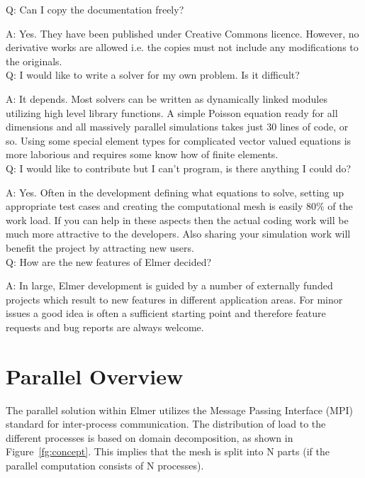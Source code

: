     Q: Can I copy the documentation freely?

    A: Yes. They have been published under Creative Commons licence. However, no derivative works are allowed i.e. the copies must not include any modifications to the originals.\\

    Q: I would like to write a solver for my own problem. Is it difficult?

    A: It depends. Most solvers can be written as dynamically linked modules utilizing high level library functions. A simple Poisson equation ready for all dimensions and all massively parallel simulations takes just 30 lines of code, or so. Using some special element types for complicated vector valued equations is more laborious and requires some know how of finite elements.\\

    Q: I would like to contribute but I can't program, is there anything I could do?

    A: Yes. Often in the development defining what equations to solve, setting up appropriate test cases and creating the computational mesh is easily 80\% of the work load. If you can help in these aspects then the actual coding work will be much more attractive to the developers. Also sharing your simulation work will benefit the project by attracting new users.\\

    Q: How are the new features of Elmer decided?

    A: In large, Elmer development is guided by a number of externally funded projects which result to new features in different application areas. For minor issues a good idea is often a sufficient starting point and therefore feature requests and bug reports are always welcome.

\section{Parallel Overview}

The parallel solution within Elmer utilizes the Message Passing Interface (MPI) standard for inter-process communication. The distribution of load to the different processes is based on domain decomposition, as shown in Figure~\ref{fg:concept}. This implies that the mesh is split into N parts (if the parallel computation consists of N processes). 

